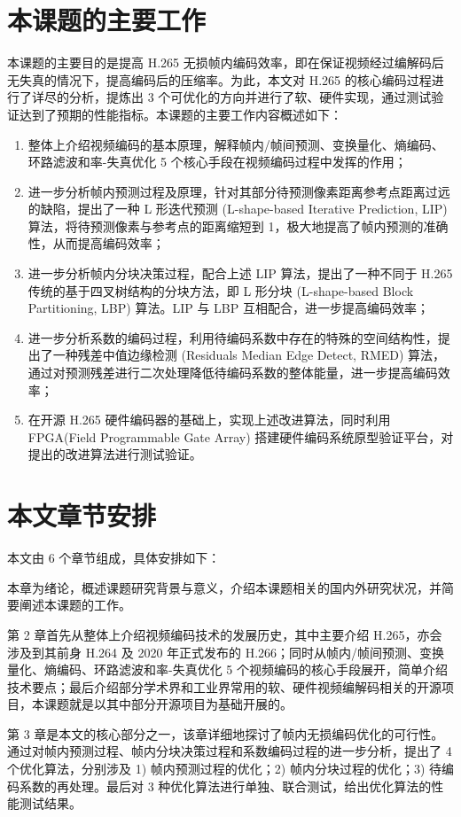 \section{本课题的主要工作}
本课题的主要目的是提高 H.265 无损帧内编码效率，即在保证视频经过编解码后无失真的情况下，提高编码后的压缩率。为此，本文对 H.265 的核心编码过程进行了详尽的分析，提炼出 3 个可优化的方向并进行了软、硬件实现，通过测试验证达到了预期的性能指标。本课题的主要工作内容概述如下：
\begin{enumerate}
    \item 整体上介绍视频编码的基本原理，解释帧内/帧间预测、变换量化、熵编码、环路滤波和率-失真优化 5 个核心手段在视频编码过程中发挥的作用；
    \item 进一步分析帧内预测过程及原理，针对其部分待预测像素距离参考点距离过远的缺陷，提出了一种 L 形迭代预测 (L-shape-based Iterative Prediction, LIP) 算法，将待预测像素与参考点的距离缩短到 1，极大地提高了帧内预测的准确性，从而提高编码效率；
    \item 进一步分析帧内分块决策过程，配合上述 LIP 算法，提出了一种不同于 H.265 传统的基于四叉树结构的分块方法，即 L 形分块 (L-shape-based Block Partitioning, LBP) 算法。LIP 与 LBP 互相配合，进一步提高编码效率；
    \item 进一步分析系数的编码过程，利用待编码系数中存在的特殊的空间结构性，提出了一种残差中值边缘检测 (Residuals Median Edge Detect, RMED) 算法，通过对预测残差进行二次处理降低待编码系数的整体能量，进一步提高编码效率；
    \item 在开源 H.265 硬件编码器的基础上，实现上述改进算法，同时利用 FPGA(Field Programmable Gate Array) 搭建硬件编码系统原型验证平台，对提出的改进算法进行测试验证。
\end{enumerate}

\section{本文章节安排}
本文由 6 个章节组成，具体安排如下：

本章为绪论，概述课题研究背景与意义，介绍本课题相关的国内外研究状况，并简要阐述本课题的工作。

第 2 章首先从整体上介绍视频编码技术的发展历史，其中主要介绍 H.265，亦会涉及到其前身 H.264 及 2020 年正式发布的 H.266；同时从帧内/帧间预测、变换量化、熵编码、环路滤波和率-失真优化 5 个视频编码的核心手段展开，简单介绍技术要点；最后介绍部分学术界和工业界常用的软、硬件视频编解码相关的开源项目，本课题就是以其中部分开源项目为基础开展的。

第 3 章是本文的核心部分之一，该章详细地探讨了帧内无损编码优化的可行性。通过对帧内预测过程、帧内分块决策过程和系数编码过程的进一步分析，提出了 4 个优化算法，分别涉及 1) 帧内预测过程的优化；2) 帧内分块过程的优化；3) 待编码系数的再处理。最后对 3 种优化算法进行单独、联合测试，给出优化算法的性能测试结果。

